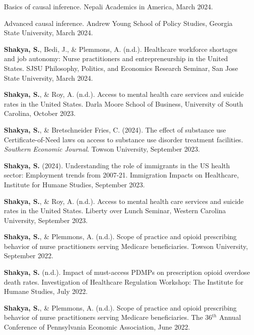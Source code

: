 \begin{etaremune}
\item Basics of causal inference. Nepali Academics in America, March 2024.

\item Advanced causal inference. Andrew Young School of Policy Studies, Georgia State University, March 2024.

\item \textbf{Shakya, S.}, Bedi, J., \& Plemmons, A. (n.d.). Healthcare workforce shortages and job autonomy: Nurse practitioners and entrepreneurship in the United States. SJSU Philosophy, Politics, and Economics Research Seminar, San Jose State University, March 2024.

\item \textbf{Shakya, S.}, \& Roy, A. (n.d.). Access to mental health care services and suicide rates in the United States. Darla Moore School of Business, University of South Carolina, October 2023.

\item \textbf{Shakya, S.}, \& Bretschneider Fries, C. (2024). The effect of substance use Certificate-of-Need laws on access to substance use disorder treatment facilities. \textit{Southern Economic Journal}. Towson University, September 2023.

\item \textbf{Shakya, S.} (2024). Understanding the role of immigrants in the US health sector: Employment trends from 2007-21. Immigration Impacts on Healthcare, Institute for Humane Studies, September 2023.

\item \textbf{Shakya, S.}, \& Roy, A. (n.d.). Access to mental health care services and suicide rates in the United States. Liberty over Lunch Seminar, Western Carolina University, September 2023.

\item \textbf{Shakya, S.}, \& Plemmons, A. (n.d.). Scope of practice and opioid prescribing behavior of nurse practitioners serving Medicare beneficiaries. Towson University, September 2022.

\item \textbf{Shakya, S.} (n.d.). Impact of must-access PDMPs on prescription opioid overdose death rates. Investigation of Healthcare Regulation Workshop: The Institute for Humane Studies, July 2022.

\item \textbf{Shakya, S.}, \& Plemmons, A. (n.d.). Scope of practice and opioid prescribing behavior of nurse practitioners serving Medicare beneficiaries. The 36$^{th}$ Annual Conference of Pennsylvania Economic Association, June 2022.


\end{etaremune}
